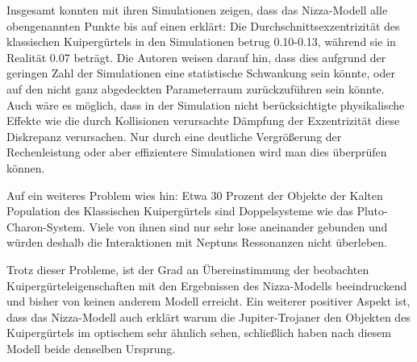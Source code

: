 \documentclass[12pt,a4paper,twoside]{article}
\renewcommand{\cite}{\citep}
\begin{document}
Insgesamt konnten \cite{Levison2008}mit ihren Simulationen zeigen, dass das Nizza-Modell alle obengenannten Punkte bis auf einen erklärt: Die Durchschnittsexzentrizität des klassischen Kuipergürtels in den Simulationen betrug 0.10-0.13, während sie in Realität 0.07 beträgt.
Die Autoren weisen darauf hin, dass dies aufgrund der geringen Zahl der Simulationen eine statistische Schwankung sein könnte, oder auf den nicht ganz abgedeckten Parameterraum zurückzuführen sein könnte. Auch wäre es möglich, dass in der Simulation nicht berücksichtigte physikalische Effekte wie die durch Kollisionen verursachte Dämpfung der Exzentrizität diese Diskrepanz verursachen\cite{Levison2008}.
Nur durch eine deutliche Vergrößerung der Rechenleistung oder aber effizientere Simulationen wird man dies überprüfen können.

Auf ein weiteres Problem wies \cite{Parker2010} hin:
Etwa 30 Prozent der Objekte der Kalten Population des Klassischen Kuipergürtels sind Doppelsysteme wie das Pluto-Charon-System. %
Viele von ihnen sind nur sehr lose aneinander gebunden und würden deshalb die Interaktionen mit Neptuns Ressonanzen nicht überleben.

Trotz dieser Probleme, ist der Grad an Übereinstimmung der beobachten Kuiper\-gürtel\-eigen\-schaften mit den Ergebnissen des Nizza-Modells beeindruckend und bisher von keinen anderem Modell erreicht. %
Ein weiterer positiver Aspekt ist, dass das Nizza-Modell auch erklärt warum die Jupiter-Trojaner den Objekten des Kuipergürtels im optischem sehr ähnlich sehen, schließlich haben nach diesem Modell beide denselben Ursprung\cite{Morbidelli2005}.
\end{document}
